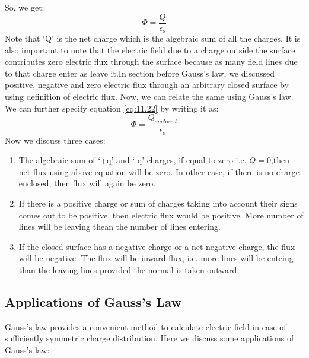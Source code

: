 So, we get:
\begin{equation}\label{eq:11.22}
  \Phi = \frac{Q}{\epsilon_{o}}
\end{equation}
Note that ‘Q’ is the net charge which is the algebraic
sum of all the charges. It is also important to note that the
electric field due to a charge outside the surface contributes zero
electric flux through the surface because as many field lines
due to that charge enter as leave it.In section before Gauss’s law,
we discussed positive, negative and zero electric flux through an
arbitrary closed surface by using definition of electric flux.
Now, we can relate the same using Gauss’s law. We can further specify equation
\ref{eq:11.22} by writing it as:
\begin{equation}\label{eq:11.23}
  \Phi = \frac{Q_{enclosed}}{\epsilon_{o}}
\end{equation}
Now we discuss three cases:
\begin{enumerate}[label=(\roman*)] 
\item The algebraic sum of ‘+q’ and ‘-q’ charges,
if equal to zero i.e. $Q = 0$,then net flux using above equation 
will be zero. In other case, if there is no charge enclosed, then flux
 will again be zero.
\item If there is a positive charge or sum of charges taking into account
their signs comes out to be positive, then electric flux would be positive.
More number of lines will be leaving thean the number of lines entering.
\item If the closed surface has a negative charge or a net negative charge,
the flux will be negative. The flux will be inward flux, i.e. more lines
will be enteing than the leaving lines provided the normal is taken outward.
\end{enumerate}

\subsection{Applications of Gauss’s Law}
Gauss’s law provides a convenient method to calculate electric field in case of sufficiently symmetric charge distribution.
Here we discuss some applications of Gauss’s law:

